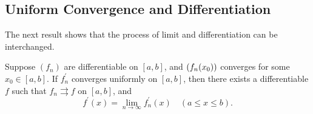 \subsection{Uniform Convergence and Differentiation}
The next result shows that the process of limit and differentiation can be interchanged.

\begin{proposition}\label{prop:uniform-convergence-differentiation}
Suppose $(f_n)$ are differentiable on $[a,b]$, and $\left(f_n(x_0)\right)$ converges for some $x_0\in[a,b]$. If $f_n^\prime$ converges uniformly on $[a,b]$, then there exists a differentiable $f$ such that $f_n\rightrightarrows f$ on $[a,b]$, and
\begin{equation}\label{eqn:uniform-convergence-differentiation}
f^\prime(x)=\lim_{n\to\infty}f_n^\prime(x)\quad(a\le x\le b).
\end{equation}
\end{proposition}

